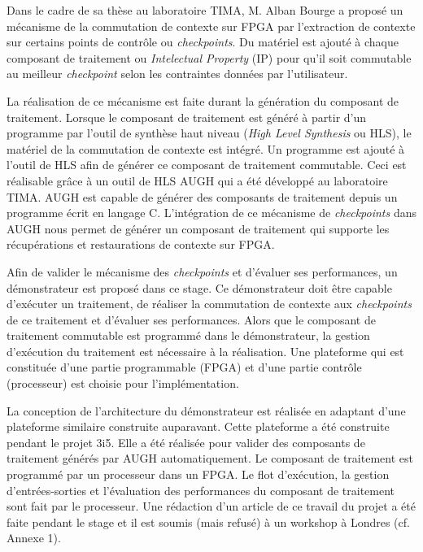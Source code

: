 Dans le cadre de sa thèse au laboratoire TIMA, M. Alban Bourge a proposé un mécanisme de la commutation 
de contexte sur FPGA par l'extraction de contexte sur certains points de contrôle\cite{Bourge2015} ou \emph{checkpoints}. 
Du matériel est ajouté à chaque composant de traitement ou \emph{Intelectual Property} (\gls{IP}) pour qu'il soit 
commutable au meilleur \emph{checkpoint} selon les contraintes données par l'utilisateur.

La réalisation de ce mécanisme est faite durant la génération du composant de traitement.
Lorsque le composant de traitement est généré à partir d'un programme par l'outil
de synthèse haut niveau (\emph{High Level Synthesis} ou \gls{HLS}), le matériel de 
la commutation de contexte est intégré. Un programme est ajouté à l'outil de HLS
afin de générer ce composant de traitement commutable.
Ceci est réalisable grâce à un outil de HLS AUGH\cite{Prost2014}
qui a été développé au laboratoire TIMA.
AUGH est capable de générer des composants de traitement 
depuis un programme écrit en langage C. L'intégration de ce mécanisme de \emph{checkpoints} dans AUGH 
nous permet de générer un composant de traitement qui supporte 
les récupérations et restaurations de contexte sur FPGA.

Afin de valider le mécanisme des \emph{checkpoints} et d'évaluer ses performances, un démonstrateur
est proposé dans ce stage. Ce démonstrateur doit être capable d'exécuter un traitement, de réaliser la commutation
de contexte aux \emph{checkpoints} de ce traitement et d'évaluer ses performances. Alors que le composant de traitement commutable
est programmé dans le démonstrateur, la gestion d'exécution du traitement est nécessaire à la réalisation.
Une plateforme qui est constituée d'une partie programmable (FPGA) et d'une partie contrôle (processeur)
est choisie pour l'implémentation.

La conception de l'architecture du démonstrateur est réalisée en adaptant d'une plateforme similaire construite auparavant.
Cette plateforme a été construite pendant le projet 3i5. Elle a été réalisée pour
valider des composants de traitement générés par AUGH automatiquement\cite{Brisebard2015, Wicaksana2015}.
Le composant de traitement est programmé par un processeur dans un FPGA. Le flot d'exécution, la gestion
d'entrées-sorties et l'évaluation des performances du composant de traitement sont fait par le processeur.
Une rédaction d'un article de ce travail du projet a été faite pendant le stage 
et il est soumis (mais refusé) à un workshop à Londres (cf. Annexe 1).


